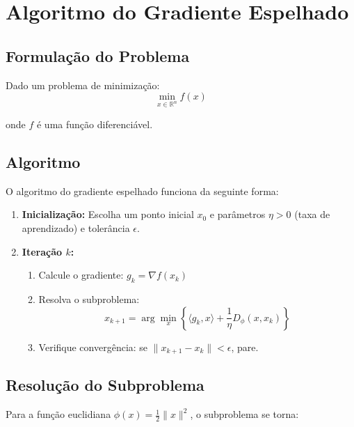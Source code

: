 \documentclass[12pt]{article}
\begin{document}
\section{Algoritmo do Gradiente Espelhado}

\subsection{Formulação do Problema}

Dado um problema de minimização:
\begin{equation}
\min_{x \in \mathbb{R}^n} f(x)
\end{equation}

onde $f$ é uma função diferenciável.

\subsection{Algoritmo}

O algoritmo do gradiente espelhado funciona da seguinte forma:

\begin{enumerate}[label=\textbf{Passo \arabic*:}]
    \item \textbf{Inicialização:} Escolha um ponto inicial $x_0$ e parâmetros $\eta > 0$ (taxa de aprendizado) e tolerância $\epsilon$.
    
    \item \textbf{Iteração $k$:}
    \begin{enumerate}[label=(\alph*)]
        \item Calcule o gradiente: $g_k = \nabla f(x_k)$
        \item Resolva o subproblema:
        \begin{equation}
        x_{k+1} = \arg\min_{x} \left\{ \langle g_k, x \rangle + \frac{1}{\eta} D_\phi(x, x_k) \right\}
        \end{equation}
        \item Verifique convergência: se $\|x_{k+1} - x_k\| < \epsilon$, pare.
    \end{enumerate}
\end{enumerate}

\subsection{Resolução do Subproblema}

Para a função euclidiana $\phi(x) = \frac{1}{2}\|x\|^2$, o subproblema se torna:
\end{document}
